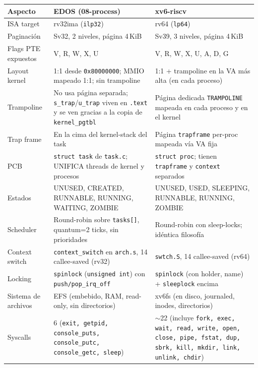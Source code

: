 \documentclass[11pt,a4paper]{article}
\begin{document}
\begin{center}
\footnotesize
\begin{longtable}{@{}p{3.5cm}p{6cm}p{6cm}@{}}
\toprule
Aspecto & \textbf{EDOS (08-process)} & \textbf{xv6-riscv} \\
\midrule
ISA target           & rv32ima (\texttt{ilp32}) & rv64 (\texttt{lp64}) \\
Paginación           & Sv32, 2 niveles, página 4\,KiB & Sv39, 3 niveles, página 4\,KiB \\
Flags PTE expuestos  & V, R, W, X, U & V, R, W, X, U, A, D, G \\
Layout kernel        & 1:1 desde \texttt{0x80000000}; MMIO mapeado 1:1; sin trampoline & 1:1 + trampoline en la VA más alta (en cada proceso) \\
Trampoline           & No usa página separada; \texttt{s\_trap}/\texttt{u\_trap} viven en \texttt{.text} y se ven gracias a la copia de \texttt{kernel\_pgtbl} & Página dedicada \texttt{TRAMPOLINE} mapeada en cada proceso y en el kernel \\
Trap frame           & En la cima del kernel-stack del task & Página \texttt{trapframe} per-proc mapeada vía VA fija \\
PCB                  & \texttt{struct task} de \texttt{task.c}; UNIFICA threads de kernel y procesos & \texttt{struct proc}; tienen \texttt{trapframe} y \texttt{context} separados \\
Estados              & UNUSED, CREATED, RUNNABLE, RUNNING, WAITING, ZOMBIE & UNUSED, USED, SLEEPING, RUNNABLE, RUNNING, ZOMBIE \\
Scheduler            & Round-robin sobre \texttt{tasks[]}, quantum=2 ticks, sin prioridades & Round-robin con sleep-locks; idéntica filosofía \\
Context switch       & \texttt{context\_switch} en \texttt{arch.s}, 14 callee-saved (rv32) & \texttt{swtch.S}, 14 callee-saved (rv64) \\
Locking              & \texttt{spinlock} (\texttt{unsigned int}) con \texttt{push/pop\_irq\_off} & \texttt{spinlock} (con holder, name) + \texttt{sleeplock} encima \\
Sistema de archivos  & EFS (embebido, RAM, read-only, sin directorios) & xv6fs (en disco, journaled, inodes, directorios) \\
Syscalls             & 6 (\texttt{exit, getpid, console\_puts, console\_putc, console\_getc, sleep}) & $\sim$22 (incluye \texttt{fork, exec, wait, read, write, open, close, pipe, fstat, dup, sbrk, kill, mkdir, link, unlink, chdir}) \\

\end{longtable}
\end{center}
\end{document}
